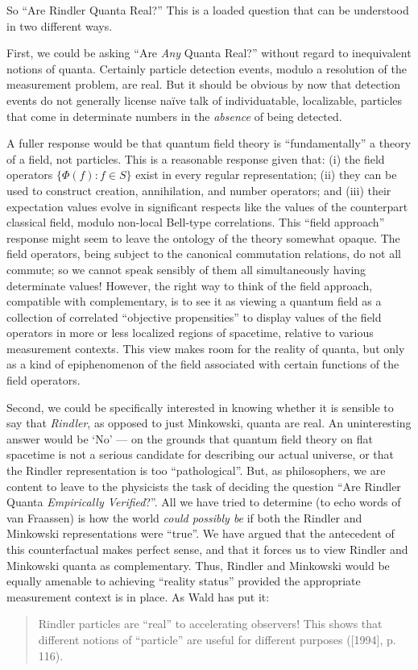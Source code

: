 \documentclass[12pt]{article}
\theoremstyle{remark}
\theoremstyle{definition}
\begin{document}
So ``Are Rindler Quanta Real?''  This is a loaded question that can be
understood in two different ways.
  
First, we could be asking ``Are \emph{Any} Quanta Real?'' without
regard to inequivalent notions of quanta.  Certainly particle
detection events, modulo a resolution of the measurement problem, are
real.  But it should be obvious by now that detection events do not
generally license na\"{i}ve talk of individuatable, localizable,
particles that come in determinate numbers in the \emph{absence} of
being detected.
  
A fuller response would be that quantum field theory is
``fundamentally'' a theory of a field, not particles.  This is a
reasonable response given that: (i) the field operators
$\{\Phi(f):f\in S\}$ exist in every regular representation; (ii) they
can be used to construct creation, annihilation, and number operators;
and (iii) their expectation values evolve in significant respects like
the values of the counterpart classical field, modulo non-local
Bell-type correlations.  This ``field approach'' response might seem
to leave the ontology of the theory somewhat opaque.  The field
operators, being subject to the canonical commutation relations, do
not all commute; so we cannot speak sensibly of them all
simultaneously having determinate values!  However, the right way to
think of the field approach, compatible with complementary, is to see
it as viewing a quantum field as a collection of correlated
``objective propensities'' to display values of the field operators in
more or less localized regions of spacetime, relative to various
measurement contexts.  This view makes room for the reality of quanta,
but only as a kind of epiphenomenon of the field associated with
certain functions of the field operators.
  
  Second, we could be specifically interested in knowing whether it is 
  sensible to say that \emph{Rindler}, as opposed to just 
  Minkowski, quanta are real.  An uninteresting answer would be 
  `No' --- on the grounds that quantum field theory on flat spacetime 
  is not a serious candidate for describing our actual universe, or 
  that the Rindler representation is too ``pathological''.  But, as 
  philosophers, we are content to leave to the physicists the task of 
  deciding 
  the question ``Are Rindler 
  Quanta 
  \emph{Empirically Verified}?''.  
  All we have tried to determine (to echo words of van Fraassen)
  is how the world \emph{could possibly be} if both the Rindler and Minkowski 
  representations were ``true''.  We have argued that the antecedent 
  of this counterfactual makes perfect sense, and that it forces us to 
  view Rindler and Minkowski quanta as complementary.  Thus, 
  Rindler and Minkowski 
  would be equally amenable to achieving ``reality status'' provided the appropriate 
  measurement context is in place.  
  As Wald has put it:
  \begin{quote}
    Rindler particles are ``real'' to accelerating observers!  This
    shows that different notions of ``particle'' are useful for
    different purposes ([1994], p. 116).
\end{quote}
  \vspace{1em}
\end{document}
